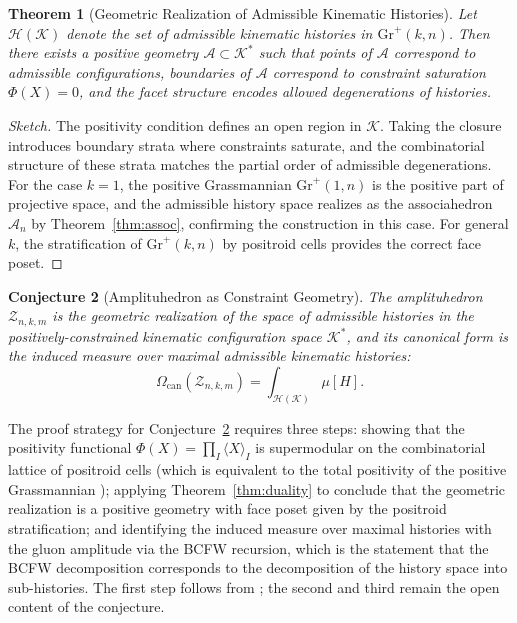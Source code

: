 \documentclass[11pt]{article}
\theoremstyle{plain}
\newtheorem{theorem}{Theorem}[section]
\newtheorem{conjecture}[theorem]{Conjecture}
\theoremstyle{definition}
\theoremstyle{remark}
\newcommand{\Phif}{\Phi}
\newcommand{\Assoc}{\mathcal{A}_n}
\newcommand{\CF}{\Omega_{\mathrm{can}}}
\begin{document}
\begin{theorem}[Geometric Realization of Admissible Kinematic Histories]
\label{thm:amplituhedron-realization}
Let $\mathcal{H}(\mathcal{K})$ denote the set of admissible kinematic histories in $\mathrm{Gr}^+(k,n)$. Then there exists a positive geometry $\mathcal{A} \subset \mathcal{K}^*$ such that points of $\mathcal{A}$ correspond to admissible configurations, boundaries of $\mathcal{A}$ correspond to constraint saturation $\Phif(X) = 0$, and the facet structure encodes allowed degenerations of histories.
\end{theorem}

\begin{proof}[Sketch]
The positivity condition defines an open region in $\mathcal{K}$. Taking the closure introduces boundary strata where constraints saturate, and the combinatorial structure of these strata matches the partial order of admissible degenerations. For the case $k=1$, the positive Grassmannian $\mathrm{Gr}^+(1,n)$ is the positive part of projective space, and the admissible history space realizes as the associahedron $\Assoc$ by Theorem~\ref{thm:assoc}, confirming the construction in this case. For general $k$, the stratification of $\mathrm{Gr}^+(k,n)$ by positroid cells provides the correct face poset.
\end{proof}

\begin{conjecture}[Amplituhedron as Constraint Geometry]
\label{conj:amplituhedron}
The amplituhedron $\mathcal{Z}_{n,k,m}$ is the geometric realization of the space of admissible histories in the positively-constrained kinematic configuration space $\mathcal{K}^*$, and its canonical form is the induced measure over maximal admissible kinematic histories:
\[
  \CF(\mathcal{Z}_{n,k,m}) = \int_{\mathcal{H}(\mathcal{K})} \mu[H].
\]
\end{conjecture}

The proof strategy for Conjecture~\ref{conj:amplituhedron} requires three steps: showing that the positivity functional $\Phif(X) = \prod_I \langle X \rangle_I$ is supermodular on the combinatorial lattice of positroid cells (which is equivalent to the total positivity of the positive Grassmannian \cite{Postnikov2006}); applying Theorem~\ref{thm:duality} to conclude that the geometric realization is a positive geometry with face poset given by the positroid stratification; and identifying the induced measure over maximal histories with the gluon amplitude via the BCFW recursion, which is the statement that the BCFW decomposition corresponds to the decomposition of the history space into sub-histories. The first step follows from \cite{Postnikov2006}; the second and third remain the open content of the conjecture.
\end{document}
